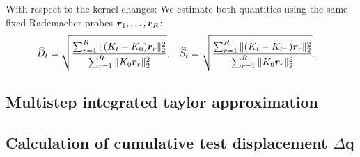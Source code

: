 \documentclass[10pt]{article} %
\DeclareRobustCommand{\titlevq}{\bm{q}}
\begin{document}
With respect to the kernel changes:
We estimate both quantities using the same fixed Rademacher probes ${\bm{r}}_1,\ldots,{\bm{r}}_R$:
\begin{align}
    \widehat D_t
    &= \sqrt{\frac{\sum_{r=1}^{R}\|(K_t-K_0){\bm{r}}_r\|_2^2}
                        {\sum_{r=1}^{R}\|K_0{\bm{r}}_r\|_2^2}}, &
    \widehat S_t
    &= \sqrt{\frac{\sum_{r=1}^{R}\|(K_t-K_{t^-}){\bm{r}}_r\|_2^2}
                        {\sum_{r=1}^{R}\|K_0{\bm{r}}_r\|_2^2}}.
\end{align}

\subsection{Multistep integrated taylor approximation} 
\label{ap:taylor-integrated}

\subsection{Calculation of cumulative test displacement \texorpdfstring{$\Delta\titlevq$}{Delta q}}
\label{ap:test-displacement}
\end{document}

